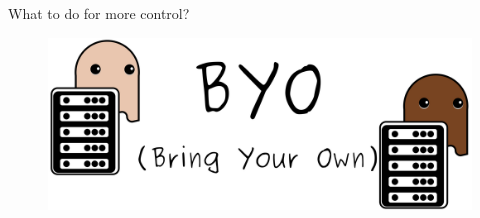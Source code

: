\begin{frame}{What to do for more control?}
	\begin{figure}
		\centering
		\includegraphics[width=\linewidth]{graphics/BYO.png}
	\end{figure}
\end{frame}